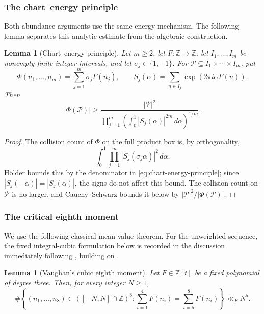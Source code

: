 \documentclass[11pt,reqno]{amsart}
\newtheorem{lemma}[theorem]{Lemma}
\theoremstyle{definition}
\theoremstyle{remark}
\newcommand{\Z}{\mathbb Z}
\begin{document}
\subsubsection{The chart--energy principle}

Both abundance arguments use the same energy mechanism.  The following
lemma separates this analytic estimate from the algebraic construction.

\begin{lemma}[Chart--energy principle]\label{lem:chart-energy}
Let $m\geq2$, let $F:\mathbb Z\to\mathbb Z$, let $I_1,\ldots,I_m$ be
nonempty finite
integer intervals, and let $\sigma_j\in\{1,-1\}$.  For
$\mathcal P\subseteq I_1\times\cdots\times I_m$, put
\[
 \Phi(n_1,\ldots,n_m)=\sum_{j=1}^m\sigma_jF(n_j),\qquad
 S_j(\alpha)=\sum_{n\in I_j}\exp(2\pi i\alpha F(n)).
\]
Then
\begin{equation}\label{eq:chart-energy-principle}
 |\Phi(\mathcal P)|\geq
 \frac{|\mathcal P|^2}
 {\displaystyle\prod_{j=1}^m
  \left(\int_0^1|S_j(\alpha)|^{2m}\,d\alpha\right)^{1/m}}.
\end{equation}
\end{lemma}

\begin{proof}
The collision count of $\Phi$ on the full product box is, by
orthogonality,
\[
 \int_0^1\prod_{j=1}^m|S_j(\sigma_j\alpha)|^2\,d\alpha.
\]
H\"older bounds this by the denominator in
\eqref{eq:chart-energy-principle}; since
$|S_j(-\alpha)|=|S_j(\alpha)|$, the signs do not affect this bound.  The
collision count on $\mathcal P$ is no larger, and
Cauchy--Schwarz bounds it below by
$|\mathcal P|^2/|\Phi(\mathcal P)|$.
\end{proof}

\subsubsection{The critical eighth moment}

We use the following classical mean-value theorem.  For the unweighted
sequence, the fixed integral-cubic formulation below is recorded in the
discussion immediately following \cite[Theorem~4.1]{HughesWooley2022},
building on \cite[Theorem~2]{Vaughan1986}.

\begin{lemma}[Vaughan's cubic eighth moment]\label{lem:cubiceighth}
Let $F\in\Z[t]$ be a fixed polynomial of degree three.  Then, for every
integer $N\geq 1$,
\begin{equation}\label{eq:cubiceighth}
 \#\left\{(n_1,\ldots,n_8)\in([-N,N]\cap\Z)^8:
  \sum_{i=1}^4F(n_i)=\sum_{i=5}^8F(n_i)\right\}
 \ll_F N^5.
\end{equation}
\end{lemma}
\end{document}
